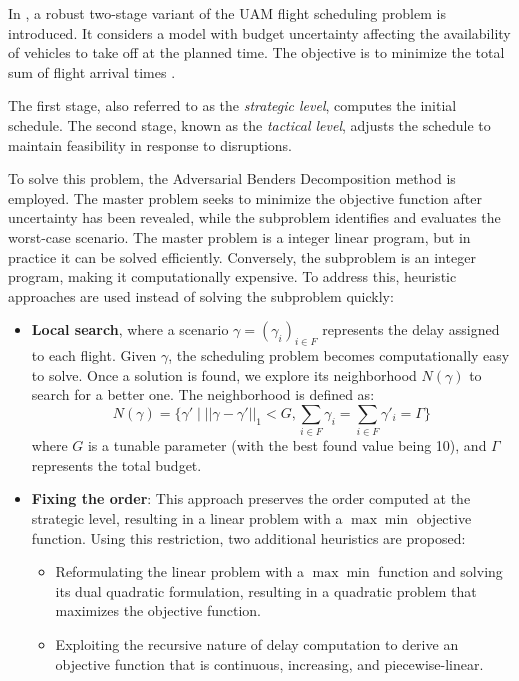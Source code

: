 \documentclass[../../thesis.tex]{subfiles}
\begin{document}
In \cite{portoleau-2024}, a robust two-stage variant of the UAM flight scheduling problem is introduced.  
It considers a model with budget uncertainty affecting the availability of vehicles to take off at the planned time. The objective is to minimize the total sum of flight arrival times .%

The first stage, also referred to as the \textit{strategic level}, computes the initial schedule.  
The second stage, known as the \textit{tactical level}, adjusts the schedule to maintain feasibility in response to disruptions.  

To solve this problem, the Adversarial Benders Decomposition method is employed.  
The master problem seeks to minimize the objective function after uncertainty has been revealed, while the subproblem identifies and evaluates the worst-case scenario.  
The master problem is a integer linear program, but in practice it can be solved efficiently.
Conversely, the subproblem is an integer program, making it computationally expensive. To address this, heuristic approaches are used instead of solving the subproblem quickly:  
\begin{itemize}
    \item \textbf{Local search}, where a scenario \(\gamma = (\gamma_i)_{i\in F}\) represents the delay assigned to each flight.  
    Given \(\gamma\), the scheduling problem becomes computationally easy to solve. Once a solution is found, we explore its neighborhood \(N(\gamma)\) to search for a better one.  
    The neighborhood is defined as:  
    \[
    N(\gamma) = \{\gamma' \mid ||\gamma - \gamma'||_1 < G, \sum_{i\in F} \gamma_i = \sum_{i\in F} \gamma'_i = \Gamma\}
    \]
    where \(G\) is a tunable parameter (with the best found value being 10), and \(\Gamma\) represents the total budget.
    
\item \textbf{Fixing the order}: This approach preserves the order computed at the strategic level, resulting in a linear problem with a $\max\min$ objective function.  
Using this restriction, two additional heuristics are proposed:  
\begin{itemize}
    \item Reformulating the linear problem with a $\max\min$ function and solving its dual quadratic formulation, resulting in a quadratic problem that maximizes the objective function.
    \item Exploiting the recursive nature of delay computation to derive an objective function that is continuous, increasing, and piecewise-linear.  
    \end{itemize}
\end{itemize}
\end{document}
